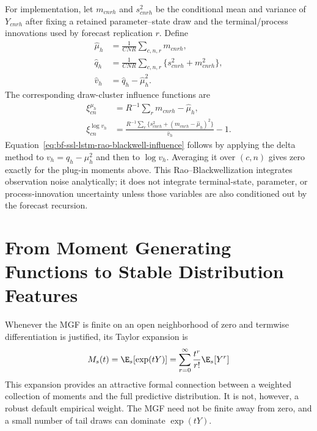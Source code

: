 For implementation, let $m_{cnrh}$ and $s^2_{cnrh}$ be the conditional mean
and variance of $Y_{cnrh}$ after fixing a retained parameter--state draw and
the terminal/process innovations used by forecast replication $r$.  Define
\begin{align}
  \widehat\mu_h
    &=\frac{1}{CNR}\sum_{c,n,r}m_{cnrh},\\
  \widehat q_h
    &=\frac{1}{CNR}\sum_{c,n,r}\{s^2_{cnrh}+m_{cnrh}^2\},\\
  \widehat v_h
    &=\widehat q_h-\widehat\mu_h^2.
  \label{eq:bf-ssl-lstm-rao-blackwell-estimator}
\end{align}
The corresponding draw-cluster influence functions are
\begin{align}
  \xi^{\mu_h}_{cn}
    &=R^{-1}\sum_r m_{cnrh}-\widehat\mu_h,\\
  \xi^{\log v_h}_{cn}
    &=\frac{R^{-1}\sum_r\{s^2_{cnrh}+
                   (m_{cnrh}-\widehat\mu_h)^2\}}{\widehat v_h}-1.
  \label{eq:bf-ssl-lstm-rao-blackwell-influence}
\end{align}
Equation~\eqref{eq:bf-ssl-lstm-rao-blackwell-influence} follows by applying
the delta method to $v_h=q_h-\mu_h^2$ and then to $\log v_h$.  Averaging it
over $(c,n)$ gives zero exactly for the plug-in moments above.  This
Rao--Blackwellization integrates observation noise analytically; it does not
integrate terminal-state, parameter, or process-innovation uncertainty unless
those variables are also conditioned out by the forecast recursion.

\section[MGFs and Stable Distribution Features]
{From Moment Generating Functions to Stable Distribution Features}
\label{sec:bf-ssl-lstm-mgf-cf}

Whenever the MGF is finite on an open neighborhood of zero and termwise
differentiation is justified, its Taylor expansion is
\begin{equation}
  M_s(t)=\E_s[\exp(tY)]
  =\sum_{r=0}^{\infty}\frac{t^r}{r!}\E_s[Y^r]
  \label{eq:bf-ssl-lstm-mgf}
\end{equation}
This expansion provides an attractive formal connection between a weighted
collection of moments and the full predictive distribution.  It is not,
however, a robust default empirical weight.  The MGF need not be finite away
from zero, and a small number of tail draws can dominate $\exp(tY)$.

